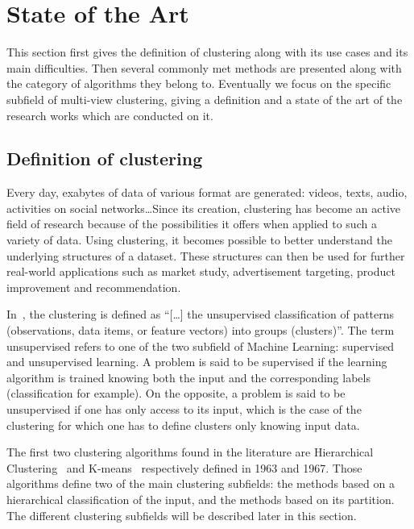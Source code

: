 %
\chapter{State of the Art}
This section first gives the definition of clustering along with its use cases and its main difficulties. Then several commonly met methods are presented along with the category of algorithms they belong to. Eventually we focus on the specific subfield of multi-view clustering, giving a definition and a state of the art of the research works which are conducted on it.

    \section{Definition of clustering}
    Every day, exabytes of data of various format are generated: videos, texts, audio, activities on social networks\ldots Since its creation, clustering has become an active field of research because of the possibilities it offers when applied to such a variety of data. Using clustering, it becomes possible to better understand the underlying structures of a dataset. These structures can then be used for further real-world applications such as market study, advertisement targeting, product improvement and recommendation.

    In~\cite{jain1999data}, the clustering is defined as ``[\ldots] the unsupervised classification of patterns (observations, data items, or feature vectors) into groups (clusters)''. The term unsupervised refers to one of the two subfield of Machine Learning: supervised and unsupervised learning. A problem is said to be supervised if the learning algorithm is trained knowing both the input and the corresponding labels (classification for example). On the opposite, a problem is said to be unsupervised if one has only access to its input, which is the case of the clustering for which one has to define clusters only knowing input data.  

    The first two clustering algorithms found in the literature are Hierarchical Clustering~\cite{ward1963hierarchical} and K-means~\cite{macqueen1967some} respectively defined in 1963 and 1967. Those algorithms define two of the main clustering subfields: the methods based on a hierarchical classification of the input, and the methods based on its partition. The different clustering subfields will be described later in this section.


